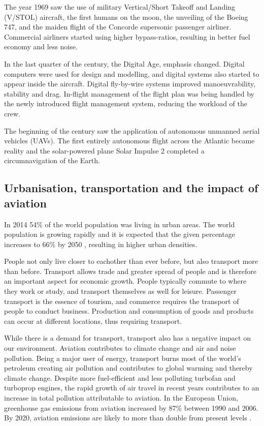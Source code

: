 The year 1969 saw the use of military Vertical/Short Takeoff and Landing
(V/STOL) aircraft, the first humans on the moon, the unveiling of the Boeing
747, and the maiden flight of the Concorde supersonic passenger airliner.
Commercial airliners started using higher bypass-ratios, resulting in better fuel
economy and less noise. 

In the last quarter of the  century, the Digital Age, emphasis changed.
Digital computers were used for design and modelling, and digital systems also
started to appear inside the aircraft. Digital fly-by-wire systems improved
manoeuvrability, stability and drag. In-flight management of the flight plan was
being handled by the newly introduced flight management system, reducing the
workload of the crew.

The beginning of the  century saw the application of autonomous unmanned
aerial vehicles (UAVs). The first entirely autonomous flight across the Atlantic
became reality and the solar-powered plane Solar Impulse 2 completed a
circumnavigation of the Earth.

\subsection{Urbanisation, transportation and the impact of aviation}
In 2014 54\% of the world population was living in urban areas. %
The world population is growing rapidly and it is expected that the given
percentage increases to 66\% by 2050 \cite{UnitedNations2014}, resulting
in higher urban densities.

People not only live closer to eachother than ever before, but also transport
more than before. Transport allows trade and greater spread of people and is
therefore an important aspect for economic growth. People typically commute to
where they work or study, and transport themselves as well for leisure.
Passenger transport is the essence of tourism, and commerce requires the
transport of people to conduct business. Production and consumption of goods and
products can occur at different locations, thus requiring transport.

While there is a demand for transport, transport also has a negative impact on
our environment. Aviation contributes to climate change and air and noise
pollution.
Being a major user of energy, transport burns most of the world's petroleum
creating air pollution and contributes to global warming and thereby climate
change. Despite more fuel-efficient and less polluting turbofan and turboprop
engines, the rapid growth of air travel in recent years contributes to an
increase in total pollution attributable to aviation. In the European Union,
greenhouse gas emissions from aviation increased by 87\% between 1990 and 2006.
By 2020, aviation emissions are likely to more than double from present levels
\cite{European2006}.

